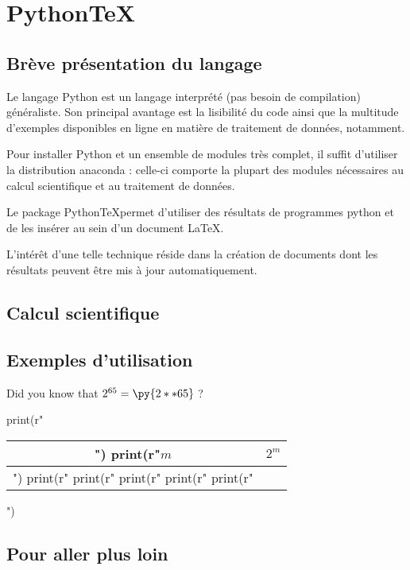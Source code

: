 
\chapter{Python\TeX}

\section{Brève présentation du langage}


Le langage Python est un langage interprété (pas besoin de compilation) généraliste. Son principal avantage est la lisibilité du code ainsi que la multitude d'exemples disponibles en ligne en matière de traitement de données, notamment.

Pour installer Python et un ensemble de modules très complet, il suffit d'utiliser la distribution anaconda : celle-ci comporte la plupart des modules nécessaires au calcul scientifique et au traitement de données.

Le package Python\TeX permet d'utiliser des résultats de programmes python et de les insérer au sein d'un document \LaTeX.

L'intérêt d'une telle technique réside dans la création de documents dont les résultats peuvent être mis à jour automatiquement.

\section{Calcul scientifique}



\section{Exemples d'utilisation}

Did you know that $2^{65} = \py{2**65}$ ?

\begin{pycode}
print(r"\begin{tabular}{c|c}")
print(r"$m$ & $2^m$ \\ \hline")
print(r"%
print(r"%
print(r"%
print(r"%
print(r"\end{tabular}")
\end{pycode}

\section{Pour aller plus loin}

